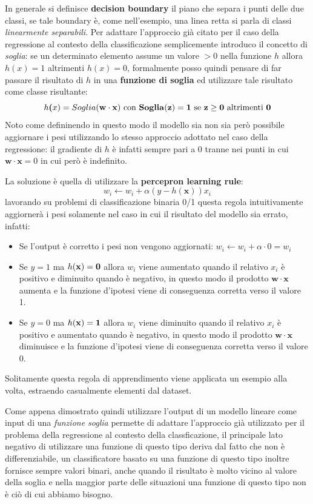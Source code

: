 \documentclass[../../main.tex]{subfiles}
\begin{document}
    In generale si definisce \textbf{decision boundary} il piano che separa i punti delle due classi, se tale boundary è, come nell'esempio, una linea retta si parla di classi \textit{linearmente separabili}. Per adattare l'approccio già citato per il caso della regressione al contesto della classificazione semplicemente introduco il concetto di \textit{soglia}: se un determinato elemento assume un valore $> 0$ nella funzione $h$ allora $h(x) = 1$ altrimenti $h(x) = 0$, formalmente posso quindi pensare di far passare il risultato di $h$ in una \textbf{funzione di soglia} ed utilizzare tale risultato come classe risultante:
    \[h\boldsymbol(x) = Soglia(\bf{w} \cdot \bf{x}) \ \text{con} \ Soglia(z) = 1 \ \text{se} \ z \geq 0 \ \text{altrimenti} \ 0\]
    Noto come defininendo in questo modo il modello sia non sia però possibile aggiornare i pesi utilizzando lo stesso approccio adottato nel caso della regressione: il gradiente di $h$ è infatti sempre pari a 0 tranne nei punti in cui $\boldsymbol{w} \cdot \boldsymbol{x} = 0$ in cui però è indefinito.
    
    La soluzione è quella di utilizzare la \textbf{percepron learning rule}:
    \[w_i \leftarrow w_i + \alpha (y - h(\boldsymbol{x})) x_i\]
    lavorando su problemi di classificazione binaria 0/1 questa regola intuitivamente aggiornerà i pesi solamente nel caso in cui il risultato del modello sia errato, infatti:
    \begin{itemize}
        \item Se l'output è corretto i pesi non vengono aggiornati: $w_i \leftarrow w_i + \alpha \cdot 0 = w_i$
        \item Se $y = 1$ ma $h(\bf{x}) = 0$ allora $w_i$ viene aumentato quando il relativo $x_i$ è positivo e diminuito quando è negativo, in questo modo il prodotto $\boldsymbol{w} \cdot \boldsymbol{x}$ aumenta e la funzione d'ipotesi viene di conseguenza corretta  verso il valore 1.
        \item Se $y = 0$ ma $h(\bf{x}) = 1$ allora $w_i$ viene diminuito quando il relativo $x_i$ è positivo e aumentato quando è negativo, in questo modo il prodotto $\boldsymbol{w} \cdot \boldsymbol{x}$ diminuisce e la funzione d'ipotesi viene di conseguenza corretta verso il valore 0.
    \end{itemize}
    Solitamente questa regola di apprendimento viene applicata un esempio alla volta, estraendo casualmente elementi dal dataset.

    Come appena dimostrato quindi utilizzare l'output di un modello lineare come input di una \textit{funzione soglia} permette di adattare l'approccio già utilizzato per il problema della regressione al contesto della classficazione, il principale lato negativo di utilizzare una funzione di questo tipo deriva dal fatto che non è differenziabile, un classificatore basato su una funzione di questo tipo inoltre fornisce sempre valori binari, anche quando il risultato è molto vicino al valore della soglia e nella maggior parte delle situazioni una funzione di questo tipo non è ciò di cui abbiamo bisogno.
\end{document}
